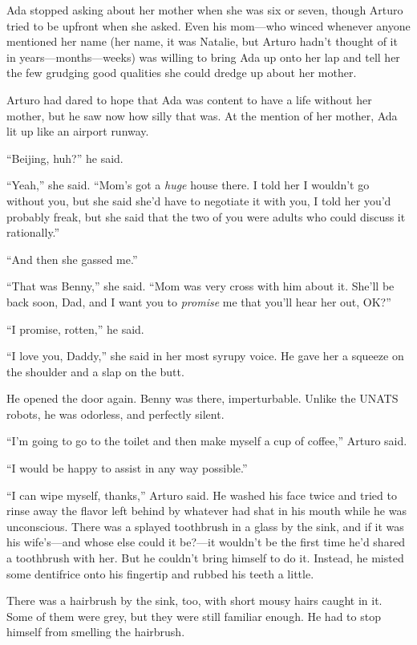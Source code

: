 Ada stopped asking about her mother when she was six or seven,
though Arturo tried to be upfront when she asked. Even his mom—who
winced whenever anyone mentioned her name (her name, it was
Natalie, but Arturo hadn’t thought of it in years—months—weeks) was
willing to bring Ada up onto her lap and tell her the few grudging
good qualities she could dredge up about her mother.

Arturo had dared to hope that Ada was content to have a life
without her mother, but he saw now how silly that was. At the
mention of her mother, Ada lit up like an airport runway.

“Beijing, huh?” he said.

“Yeah,” she said. “Mom’s got a \emph{huge} house there. I told her
I wouldn’t go without you, but she said she’d have to negotiate it
with you, I told her you’d probably freak, but she said that the
two of you were adults who could discuss it rationally.”

“And then she gassed me.”

“That was Benny,” she said. “Mom was very cross with him about it.
She’ll be back soon, Dad, and I want you to \emph{promise} me that
you’ll hear her out, OK?”

“I promise, rotten,” he said.

“I love you, Daddy,” she said in her most syrupy voice. He gave her
a squeeze on the shoulder and a slap on the butt.

He opened the door again. Benny was there, imperturbable. Unlike
the UNATS robots, he was odorless, and perfectly silent.

“I’m going to go to the toilet and then make myself a cup of
coffee,” Arturo said.

“I would be happy to assist in any way possible.”

“I can wipe myself, thanks,” Arturo said. He washed his face twice
and tried to rinse away the flavor left behind by whatever had shat
in his mouth while he was unconscious. There was a splayed
toothbrush in a glass by the sink, and if it was his wife’s—and
whose else could it be?—it wouldn’t be the first time he’d shared a
toothbrush with her. But he couldn’t bring himself to do it.
Instead, he misted some dentifrice onto his fingertip and rubbed
his teeth a little.

There was a hairbrush by the sink, too, with short mousy hairs
caught in it. Some of them were grey, but they were still familiar
enough. He had to stop himself from smelling the hairbrush.

